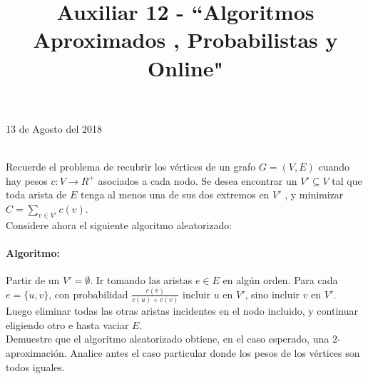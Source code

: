 \documentclass[dcc,uchile]{fcfmcourse}
\title{Auxiliar 12 - ``Algoritmos Aproximados , Probabilistas y Online"}
\theoremstyle{plain}
\theoremstyle{definition}
\begin{document}
\maketitle
\begin{center}
13 de Agosto del 2018
\end{center}
\vspace{-1ex}


\begin{problems}
\\
Recuerde el problema de recubrir los vértices de un grafo $G = (V, E)$ cuando hay pesos $c : V \to R^+$ asociados a cada nodo. Se desea encontrar un $V' \subseteq V$ tal que toda arista de $E$ tenga al menos una de sus dos extremos en $V'$ , y minimizar $C = \sum_{v\in V'}c(v)$.\\
Considere ahora el siguiente algoritmo aleatorizado:
\paragraph{Algoritmo:} Partir de un $V' = \emptyset$. Ir tomando las aristas $e \in E$ en algún orden. Para cada $e =\{u, v\}$, con probabilidad $\frac{c(v)}{c(u)+c(v)}$ incluir $u$ en $V'$, sino incluir $v$ en $V'$. Luego eliminar todas las otras aristas incidentes en el nodo incluido, y continuar eligiendo otro e hasta vaciar $E$.\\
Demuestre que el algoritmo aleatorizado obtiene, en el caso esperado, una $2$-aproximación. Analice antes el caso particular donde los pesos de los vértices son todos iguales.


\end{problems}
\end{document}
